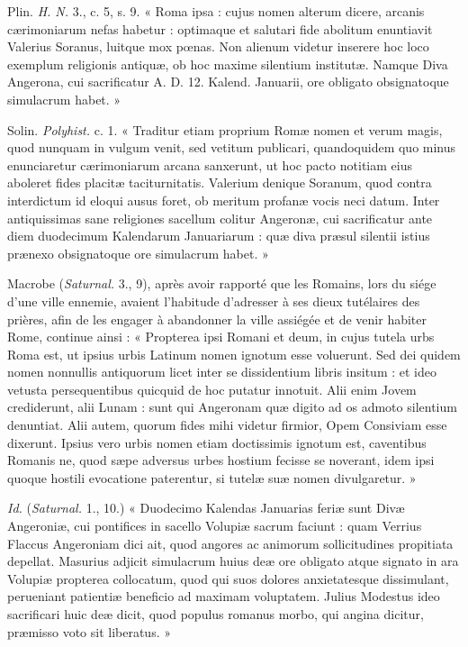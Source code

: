 \documentclass[a4paper, 11pt, oneside, polutonikogreek, french]{article}
\begin{document}
Plin. \emph{H. N.} 3., c. 5, s. 9. « Roma ipsa : cujus nomen alterum dicere, arcanis cærimoniarum nefas habetur : optimaque et salutari fide abolitum enuntiavit Valerius Soranus, luitque mox pœnas. Non alienum videtur inserere hoc loco exemplum religionis antiquæ, ob hoc maxime silentium institutæ. Namque Diva Angerona, cui sacrificatur A. D. 12. Kalend. Januarii, ore obligato obsignatoque simulacrum habet. »

Solin. \emph{Polyhist.} c. 1. « Traditur etiam proprium Romæ nomen et verum magis, quod nunquam in vulgum venit, sed vetitum publicari, quandoquidem quo minus enunciaretur cærimoniarum arcana sanxerunt, ut hoc pacto notitiam eius aboleret fides placitæ taciturnitatis. Valerium denique Soranum, quod contra interdictum id eloqui ausus foret, ob meritum profanæ vocis neci datum. Inter antiquissimas sane religiones sacellum colitur Angeronæ, cui sacrificatur ante diem duodecimum Kalendarum Januariarum : quæ diva præsul silentii istius prænexo obsignatoque ore simulacrum habet. »

Macrobe (\emph{Saturnal.} 3., 9), après avoir rapporté que les Romains, lors du siége d'une ville ennemie, avaient l'habitude d'adresser à ses dieux tutélaires des prières, afin de les engager à abandonner la ville assiégée et de venir habiter Rome, continue ainsi : « Propterea ipsi Romani et deum, in cujus tutela urbs Roma est, ut ipsius urbis Latinum nomen ignotum esse voluerunt. Sed dei quidem nomen nonnullis antiquorum licet inter se dissidentium libris insitum : et ideo vetusta persequentibus quicquid de hoc putatur innotuit. Alii enim Jovem crediderunt, alii Lunam : sunt qui Angeronam quæ digito ad os admoto silentium denuntiat. Alii autem, quorum fides mihi videtur firmior, Opem Consiviam esse dixerunt. Ipsius vero urbis nomen etiam doctissimis ignotum est, caventibus Romanis ne, quod sæpe adversus urbes hostium fecisse se noverant, idem ipsi quoque hostili evocatione paterentur, si tutelæ suæ nomen divulgaretur. »

\emph{Id.} (\emph{Saturnal.} 1., 10.) « Duodecimo Kalendas Januarias feriæ sunt Divæ Angeroniæ, cui pontifices in sacello Volupiæ sacrum faciunt : quam Verrius Flaccus Angeroniam dici ait, quod angores ac animorum sollicitudines propitiata depellat. Masurius adjicit simulacrum huius deæ ore obligato atque signato in ara Volupiæ propterea collocatum, quod qui suos dolores anxietatesque dissimulant, perueniant patientiæ beneficio ad maximam voluptatem. Julius Modestus ideo sacrificari huic deæ dicit, quod populus romanus morbo, qui angina dicitur, præmisso voto sit liberatus. »
\end{document}
